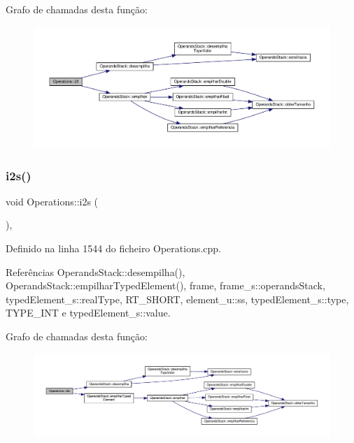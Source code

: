 Grafo de chamadas desta função\+:
\nopagebreak
\begin{figure}[H]
\begin{center}
\leavevmode
\includegraphics[width=350pt]{classOperations_ae5d28665a74411cbb880e3007c5405e8_cgraph}
\end{center}
\end{figure}
\mbox{\label{classOperations_ab83ebb06495a6e42c5edeec05e312f8c}} 
\subsubsection{\texorpdfstring{i2s()}{i2s()}}
{\footnotesize\ttfamily void Operations\+::i2s (\begin{DoxyParamCaption}{ }\end{DoxyParamCaption})\hspace{0.3cm}{\ttfamily [static]}, {\ttfamily [private]}}



Definido na linha 1544 do ficheiro Operations.\+cpp.



Referências Operands\+Stack\+::desempilha(), Operands\+Stack\+::empilhar\+Typed\+Element(), frame, frame\+\_\+s\+::operands\+Stack, typed\+Element\+\_\+s\+::real\+Type, R\+T\+\_\+\+S\+H\+O\+RT, element\+\_\+u\+::ss, typed\+Element\+\_\+s\+::type, T\+Y\+P\+E\+\_\+\+I\+NT e typed\+Element\+\_\+s\+::value.

Grafo de chamadas desta função\+:
\nopagebreak
\begin{figure}[H]
\begin{center}
\leavevmode
\includegraphics[width=350pt]{classOperations_ab83ebb06495a6e42c5edeec05e312f8c_cgraph}
\end{center}
\end{figure}
\mbox{\label{classOperations_a12d5933f0d0c91c578b76edb1971a2be}} 
